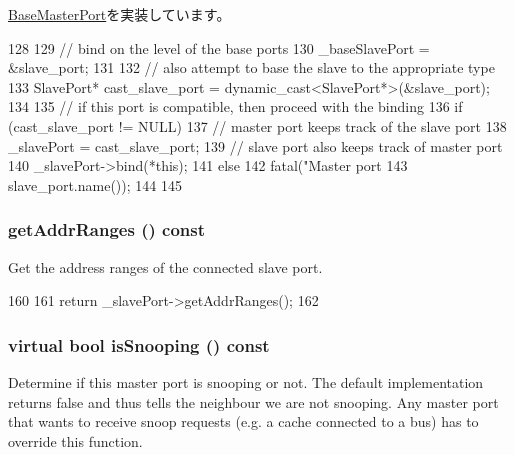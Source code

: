 \hyperlink{classBaseMasterPort_a55647ab861a1f8cf8d26df2f402188d7}{BaseMasterPort}を実装しています。


\begin{DoxyCode}
128 {
129     // bind on the level of the base ports
130     _baseSlavePort = &slave_port;
131 
132     // also attempt to base the slave to the appropriate type
133     SlavePort* cast_slave_port = dynamic_cast<SlavePort*>(&slave_port);
134 
135     // if this port is compatible, then proceed with the binding
136     if (cast_slave_port != NULL) {
137         // master port keeps track of the slave port
138         _slavePort = cast_slave_port;
139         // slave port also keeps track of master port
140         _slavePort->bind(*this);
141     } else {
142         fatal("Master port %
143               slave_port.name());
144     }
145 }
\end{DoxyCode}
\hypertarget{classMasterPort_a36cf113d5e5e091ebddb32306c098fae}{
\subsubsection[{getAddrRanges}]{ getAddrRanges () const}}
\label{classMasterPort_a36cf113d5e5e091ebddb32306c098fae}
Get the address ranges of the connected slave port. 


\begin{DoxyCode}
160 {
161     return _slavePort->getAddrRanges();
162 }
\end{DoxyCode}
\hypertarget{classMasterPort_a32602a6a3c3d66a639455036d6c08dd6}{
\subsubsection[{isSnooping}]{\setlength{\rightskip}{0pt plus 5cm}virtual bool isSnooping () const}}
\label{classMasterPort_a32602a6a3c3d66a639455036d6c08dd6}
Determine if this master port is snooping or not. The default implementation returns false and thus tells the neighbour we are not snooping. Any master port that wants to receive snoop requests (e.g. a cache connected to a bus) has to override this function.

